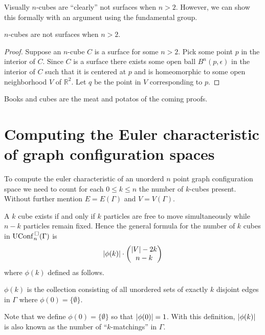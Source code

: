 Visually \(n\)-cubes are ``clearly'' not surfaces when \(n > 2\).
However, we can show this formally with an argument using the fundamental group.
\begin{thm}
\(n\)-cubes are not surfaces when \(n > 2\).
\end{thm}
\begin{proof}
    Suppose an \(n\)-cube \(C\) is a surface for some \(n > 2\).
    Pick some point \(p\) in the interior of \(C\).
    Since \(C\) is a surface there exists some open ball \(B^n(p, \epsilon)\) in the interior of \(C\) such that 
    it is centered at \(p\) and is homeomorphic to some open neighborhood \(V\) of \(\mathbb{R}^2\).
    Let \(q\) be the point in \(V\) corresponding to \(p\).
    
\end{proof}

Books and cubes are the meat and potatos of the coming proofs.

\section{Computing the Euler characteristic of graph configuration spaces}
To compute the euler characteristic of an unorderd \(n\) point graph configuration space we need to count
for each \(0 \le k \le n\) the number of \(k\)-cubes present.
Without further mention \(E = E(\Gamma)\) and \(V = V(\Gamma)\).

A \(k\) cube exists if and only if \(k\) particles are free to move simultaneously while \(n - k\)
particles remain fixed.
Hence the general formula for the number of \(k\) cubes in \(\mathrm{UConf}^{\,\square}_n(\Gamma)\) is
\[
    \left|\phi(k)\right| \cdot \begin{pmatrix}\left|V\right| - 2k \\ n - k\end{pmatrix}
\]
where \(\phi(k)\) defined as follows.

\begin{defn}
\(\phi(k)\) is the collection consisting of all unordered sets of exactly \(k\) disjoint edges in \(\Gamma\)
where \(\phi(0) = \{\emptyset\}\).
\end{defn}

Note that we define \(\phi(0) = \{\emptyset\}\) so that \(\left|\phi(0)\right| = 1\).
With this definition, \(\left|\phi(k)\right|\) is also known as the number of ``\(k\)-matchings'' in \(\Gamma\).

